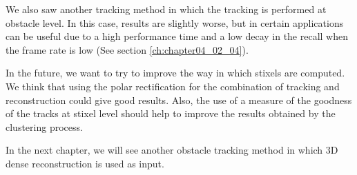 We also saw another tracking method in which the tracking is performed at obstacle level. In this case, results are slightly worse, but in certain applications can be useful due to a high performance time and a low decay in the recall when the frame rate is low (See section \ref{ch:chapter04_02_04}).

In the future, we want to try to improve the way in which stixels are computed. We think that using the polar rectification for the combination of tracking and reconstruction could give good results. Also, the use of a measure of the goodness of the tracks at stixel level should help to improve the results obtained by the clustering process.

In the next chapter, we will see another obstacle tracking method in which 3D dense reconstruction is used as input.

